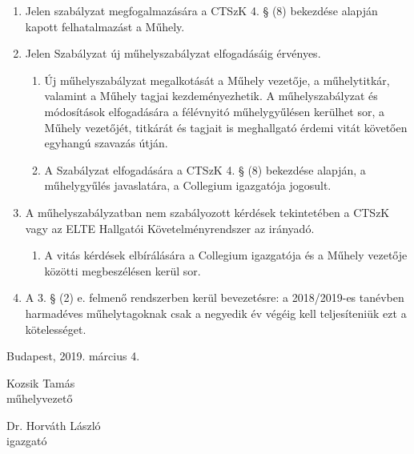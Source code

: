 \documentclass{../styles/rulebook}
\begin{document}
\begin{enumerate}
	\item Jelen szabályzat megfogalmazására a CTSzK 4. § (8) bekezdése alapján kapott felhatalmazást a Műhely.
	\item Jelen Szabályzat új műhelyszabályzat elfogadásáig érvényes.
	\begin{enumerate}
		\item Új műhelyszabályzat megalkotását a Műhely vezetője, a műhelytitkár, valamint a Műhely tagjai kezdeményezhetik. A műhelyszabályzat és módosítások elfogadására a félévnyitó műhelygyűlésen kerülhet sor, a Műhely vezetőjét, titkárát és tagjait is meghallgató érdemi vitát követően egyhangú szavazás útján.
		\item A Szabályzat elfogadására a CTSzK 4. § (8) bekezdése alapján, a műhelygyűlés javaslatára, a Collegium igazgatója jogosult.
	\end{enumerate}
	\item A műhelyszabályzatban nem szabályozott kérdések tekintetében a CTSzK vagy az ELTE Hallgatói Követelményrendszer az irányadó.
	\begin{enumerate}
		\item A vitás kérdések elbírálására a Collegium igazgatója és a Műhely vezetője közötti megbeszélésen kerül sor.
	\end{enumerate}
	\item A 3. § (2) e. felmenő rendszerben kerül bevezetésre: a 2018/2019-es tanévben harmadéves műhelytagoknak csak a negyedik év végéig kell teljesíteniük ezt a kötelességet.
\end{enumerate}

\vspace{0.3in}
Budapest, 2019. március 4.
\vspace{0.6in}

\begin{minipage}{3in}
\begin{center}
Kozsik Tamás\\
műhelyvezető
\end{center}
\end{minipage}
\begin{minipage}{3in}
\begin{center}
Dr. Horváth László\\
igazgató
\end{center}
\end{minipage}
\end{document}
